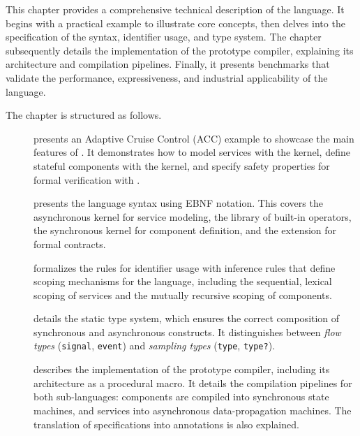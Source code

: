 This chapter provides a comprehensive technical description of the \GRust language. It begins with a
practical example to illustrate core concepts, then delves into the specification of the syntax,
identifier usage, and type system. The chapter subsequently details the implementation of the
prototype compiler, explaining its architecture and compilation pipelines. Finally, it presents
benchmarks that validate the performance, expressiveness, and industrial applicability of the
language.

The chapter is structured as follows.
\begin{description}
    \item[]
          presents an Adaptive Cruise Control (ACC) example to showcase the main features of \GRust.
          It demonstrates how to model services with the \GRFRP kernel, define stateful components
          with the \GRSync kernel, and specify safety properties for formal verification with
          \GReusot.

    \item[]
          presents the language syntax using EBNF notation. This covers the asynchronous \GRFRP
          kernel for service modeling, the \GReact library of built-in operators, the synchronous
          \GRSync kernel for component definition, and the \GReusot extension for formal contracts.

    \item[]
          formalizes the rules for identifier usage with inference rules that define scoping
          mechanisms for the language, including the sequential, lexical scoping of \GRFRP services
          and the mutually recursive scoping of \GRSync components.

    \item[]
          details the static type system, which ensures the correct composition of synchronous and
          asynchronous constructs. It distinguishes between \emph{flow types} (\eg \texttt{signal},
          \texttt{event}) and \emph{sampling types} (\eg \texttt{type}, \texttt{type?}).

    \item[]
          describes the implementation of the prototype compiler, including its architecture as a
          \Rust procedural macro. It details the compilation pipelines for both sub-languages:
          \GRSync components are compiled into synchronous state machines, and \GRFRP services into
          asynchronous data-propagation machines. The translation of \GReusot specifications into
          \Creusot annotations is also explained.


\end{description}
